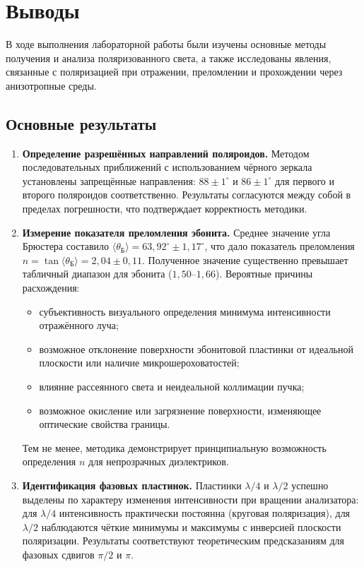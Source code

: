 \documentclass[a4paper]{article}
\begin{document}
\section{Выводы}

В ходе выполнения лабораторной работы были изучены основные методы получения и анализа поляризованного света, а также исследованы явления, связанные с поляризацией при отражении, преломлении и прохождении через анизотропные среды.

\subsection*{Основные результаты}
\begin{enumerate}
    \item \textbf{Определение разрешённых направлений поляроидов.} Методом последовательных приближений с использованием чёрного зеркала установлены запрещённые направления: $88 \pm 1^\circ$ и $86 \pm 1^\circ$ для первого и второго поляроидов соответственно. Результаты согласуются между собой в пределах погрешности, что подтверждает корректность методики.
    
    \item \textbf{Измерение показателя преломления эбонита.} Среднее значение угла Брюстера составило $\langle \theta_{\text{Б}} \rangle = 63{,}92^\circ \pm 1{,}17^\circ$, что дало показатель преломления $n = \tan \langle \theta_{\text{Б}} \rangle = 2{,}04 \pm 0{,}11$. Полученное значение существенно превышает табличный диапазон для эбонита ($1{,}50$--$1{,}66$). Вероятные причины расхождения:
    \begin{itemize}
        \item субъективность визуального определения минимума интенсивности отражённого луча;
        \item возможное отклонение поверхности эбонитовой пластинки от идеальной плоскости или наличие микрошероховатостей;
        \item влияние рассеянного света и неидеальной коллимации пучка;
        \item возможное окисление или загрязнение поверхности, изменяющее оптические свойства границы.
    \end{itemize}
    Тем не менее, методика демонстрирует принципиальную возможность определения $n$ для непрозрачных диэлектриков.
   
    
    \item \textbf{Идентификация фазовых пластинок.} Пластинки $\lambda/4$ и $\lambda/2$ успешно выделены по характеру изменения интенсивности при вращении анализатора: для $\lambda/4$ интенсивность практически постоянна (круговая поляризация), для $\lambda/2$ наблюдаются чёткие минимумы и максимумы с инверсией плоскости поляризации. Результаты соответствуют теоретическим предсказаниям для фазовых сдвигов $\pi/2$ и $\pi$.
    

\end{enumerate}
\end{document}

